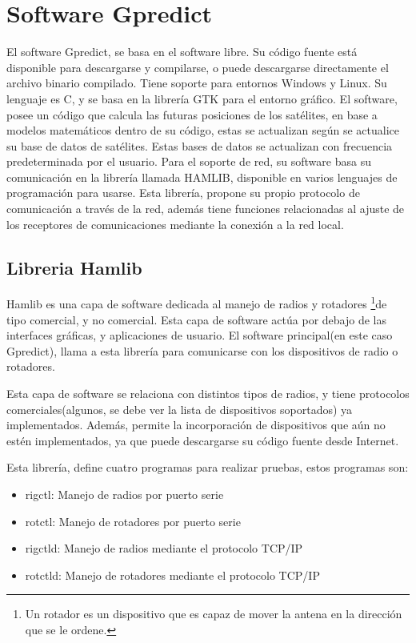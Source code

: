 \section{Software Gpredict} 
El software Gpredict, se basa en el software libre. Su código fuente está disponible para descargarse y compilarse, o puede descargarse directamente el archivo binario compilado. Tiene soporte para entornos Windows y Linux. Su lenguaje es C, y se basa en la librería GTK para el entorno gráfico. El software, posee un código que calcula las futuras posiciones de los satélites, en base a modelos matemáticos dentro de su código, estas se actualizan según se actualice su base de datos de satélites. Estas bases de datos se actualizan con frecuencia predeterminada por el usuario.  
Para el soporte de red, su software basa su comunicación en la librería llamada HAMLIB, disponible en varios lenguajes de programación para usarse. Esta librería, propone su propio protocolo de comunicación a través de la red, además tiene funciones relacionadas al ajuste de los receptores de comunicaciones mediante la conexión a la red local.   

\subsection{Libreria Hamlib}
Hamlib es una capa de software dedicada al manejo de radios y rotadores \footnote{Un rotador es un dispositivo que es capaz de mover la antena en la dirección que se le ordene.}de tipo comercial, y no comercial. Esta capa de software actúa por debajo de las interfaces gráficas, y aplicaciones de usuario. El software principal(en este caso Gpredict), llama a esta librería para comunicarse con los dispositivos de radio o rotadores. 

Esta capa de software se relaciona con distintos tipos de radios, y tiene protocolos comerciales(algunos, se debe ver la lista de dispositivos soportados) ya implementados. Además, permite la incorporación de dispositivos que aún no estén implementados, ya que puede descargarse su código fuente desde Internet. 

Esta librería, define cuatro programas para realizar pruebas, estos programas son: 
\begin{itemize}
	\item rigctl: Manejo de radios por puerto serie 
	\item rotctl: Manejo de rotadores por puerto serie
	\item rigctld: Manejo de radios mediante el protocolo TCP/IP
	\item rotctld: Manejo de rotadores mediante el protocolo TCP/IP
\end{itemize}

